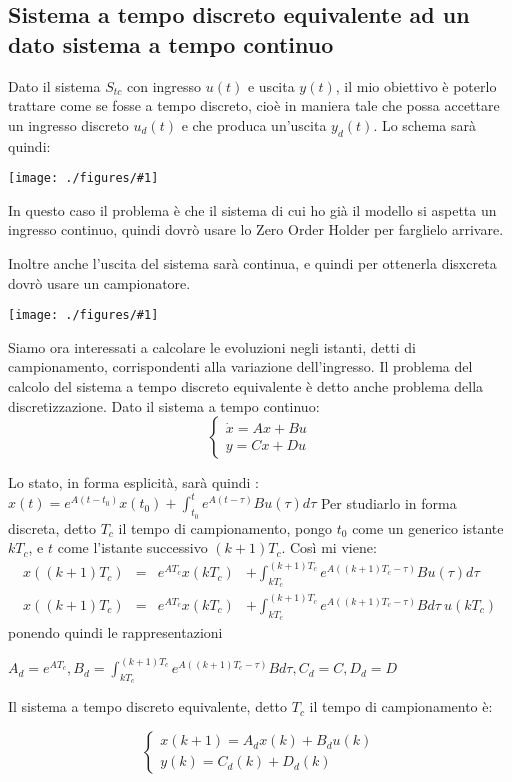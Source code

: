\documentclass{article}
\newcommand{\incfig}[2]{%
	\texttt{[image: ./figures/\#1]}%
}
\begin{document}
\subsection{Sistema a tempo discreto equivalente ad un dato sistema a tempo continuo}
Dato il sistema $S_{tc}$ con ingresso $u(t)$ e uscita $y(t)$, il mio obiettivo è poterlo trattare come se fosse a tempo discreto, cioè in maniera tale
che possa accettare un ingresso discreto $u_d(t)$ e che produca un'uscita $y_d(t)$.
Lo schema sarà quindi:

\incfig{ZOH.jpeg}{0.4}

In questo caso il problema è che il sistema di cui ho già il modello si aspetta un ingresso continuo, quindi dovrò usare lo Zero Order Holder per
farglielo arrivare.

Inoltre anche l'uscita del sistema sarà continua, e quindi per ottenerla disxcreta dovrò usare un campionatore.

\incfig{discreto.jpeg}{0.4}

Siamo ora interessati a calcolare le evoluzioni negli istanti, detti di campionamento, corrispondenti alla variazione dell'ingresso.
Il problema del calcolo del sistema a tempo discreto equivalente è detto anche problema della discretizzazione. Dato il sistema a tempo continuo:
\[
\begin{cases}
    \dot{x} = Ax+Bu\\
    y = Cx+Du
\end{cases}
\]

Lo stato, in forma esplicità, sarà quindi : \(\displaystyle x(t) = e^{A(t-t_0)}x(t_0) + \int_{t_0}^{t} e^{A(t-\tau)}Bu(\tau)d\tau\)
Per studiarlo in forma discreta, detto $T_c$ il tempo di campionamento, pongo $t_0$ come un generico istante $kT_c$, e $t$ come l'istante successivo
$(k+1)T_c$. Così mi viene:
\begin{align*} 
    x((k+1)T_c) &=& e^{AT_c}x(kT_c) &+ \int_{kT_c}^{(k+1)T_c} e ^{A((k+1)T_c-\tau)}B u(\tau) d\tau \\
    x((k+1)T_c) &=& e^{AT_c}x(kT_c) &+ \int_{kT_c}^{(k+1)T_c} e ^{A((k+1)T_c-\tau)}B  d\tau \ u(kT_c)
\end{align*}
ponendo quindi le rappresentazioni 

\(\displaystyle A_d=e^{AT_c}, B_d=\int_{kT_c}^{(k+1)T_c} e^{A((k+1)T_c-\tau)}B d\tau , C_d = C,  D_d=D\)

Il sistema a tempo discreto equivalente, detto $T_c$ il tempo di campionamento è:

\[
\begin{cases}
    x(k+1)=A_d x(k)+B_d u(k)\\
    y(k)=C_d (k) + D_d(k)
\end{cases}
\]
\end{document}
